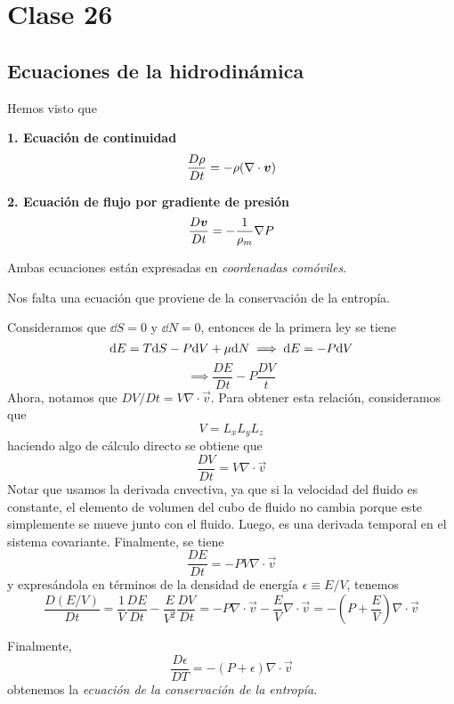 \section{Clase 26}
\subsection{Ecuaciones de la hidrodinámica}
Hemos visto que

\begin{tcolorbox}
\textbf{1. Ecuación de continuidad}
\begin{equation}\label{26.1}
  \frac{D \rho }{D t}=-\rho (\nabla\cdot \vb*{v})
\end{equation}

\textbf{2. Ecuación de flujo por gradiente de presión}
\begin{equation}\label{26.2}
  \frac{D\vb*{v}}{D t}=-\frac{1}{\rho_m}\nabla P
\end{equation}
\end{tcolorbox}
Ambas ecuaciones están expresadas en \textit{coordenadas comóviles}.

Nos falta una ecuación que proviene de la conservación de la entropía. 

Consideramos que $\dd S=0$ y $\dd N=0$, entonces de la primera ley se tiene
\begin{equation}
  \dd E=T\dd S-P\dd V+\mu\dd N \implies \dd E=-P\dd V
\end{equation}
\begin{equation}
  \implies\boxed{ \frac{D E}{D t}-P\frac{D V}{t}}
\end{equation}
Ahora, notamos que $D V/Dt=V\nabla\cdot\vec{v}$. Para obtener esta relación, consideramos que
\begin{equation}
  V=L_xL_yL_z
\end{equation}
haciendo algo de cálculo directo se obtiene que
\begin{equation}
\boxed{  \frac{D V}{D t}=V\nabla\cdot\vec{v}}
\end{equation}
Notar que usamos la derivada cnvectiva, ya que si la velocidad del fluido es constante, el elemento de volumen del cubo de fluido no cambia porque este simplemente se mueve junto con el fluido. Luego, es una derivada temporal en el sistema covariante. Finalmente, se tiene
\begin{equation}
  \frac{D E}{Dt}=-PV\nabla\cdot\vec{v}
\end{equation}
y expresándola en términos de la densidad de energía $\epsilon\equiv E/V$, tenemos
\begin{equation}
  \frac{D(E/V)}{D t}=\frac{1}{V}\frac{DE}{Dt}-\frac{E}{V^2}\frac{DV}{Dt}=-P\nabla\cdot\vec{v}-\frac{E}{V}\nabla\cdot\vec{v}=-\left(P+\frac{E}{V}\right)\nabla\cdot\vec{v}
\end{equation}
\begin{tcolorbox}
Finalmente,
\begin{equation}\label{26.3}
\boxed{  \frac{D\epsilon}{DT}=-(P+\epsilon)\nabla\cdot\vec{v}}
\end{equation}
obtenemos la \textit{ecuación de la conservación de la entropía}.
\end{tcolorbox}

